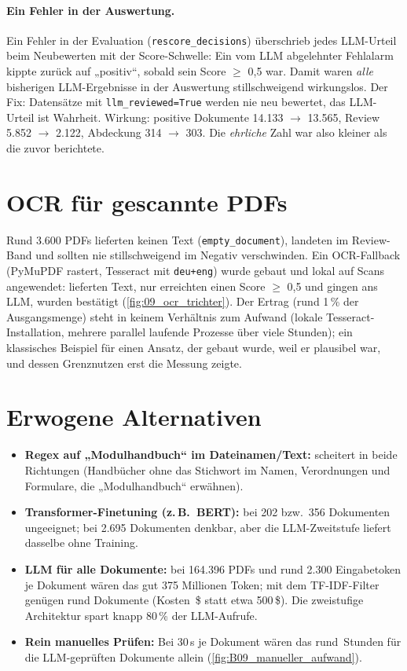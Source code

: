 \paragraph{Ein Fehler in der Auswertung.} Ein Fehler in der Evaluation (\texttt{rescore\_decisions}) überschrieb jedes LLM-Urteil beim Neubewerten mit der Score-Schwelle: Ein vom LLM abgelehnter Fehlalarm kippte zurück auf „positiv“, sobald sein Score $\ge$ 0,5 war. Damit waren \emph{alle} bisherigen LLM-Ergebnisse in der Auswertung stillschweigend wirkungslos. Der Fix: Datensätze mit \texttt{llm\_reviewed=True} werden nie neu bewertet, das LLM-Urteil ist Wahrheit. Wirkung: positive Dokumente 14.133 $\to$ 13.565, Review 5.852 $\to$ 2.122, Abdeckung 314 $\to$ 303. Die \emph{ehrliche} Zahl war also kleiner als die zuvor berichtete.

\section{OCR für gescannte PDFs}
Rund 3.600 PDFs lieferten keinen Text (\texttt{empty\_document}), landeten im Review-Band und sollten nie stillschweigend im Negativ verschwinden. Ein OCR-Fallback (PyMuPDF rastert, Tesseract mit \texttt{deu+eng}) wurde gebaut und lokal auf \zOCRDone{} Scans angewendet: \zOCRText{} lieferten Text, nur \zOCRLLM{} erreichten einen Score $\ge$ 0,5 und gingen ans LLM, \zOCRConf{} wurden bestätigt (\cref{fig:09_ocr_trichter}). Der Ertrag (rund 1\,\% der Ausgangsmenge) steht in keinem Verhältnis zum Aufwand (lokale Tesseract-Installation, mehrere parallel laufende Prozesse über viele Stunden); ein klassisches Beispiel für einen Ansatz, der gebaut wurde, weil er plausibel war, und dessen Grenznutzen erst die Messung zeigte.


\section{Erwogene Alternativen}
\begin{itemize}
  \item \textbf{Regex auf „Modulhandbuch“ im Dateinamen/Text:} scheitert in beide Richtungen (Handbücher ohne das Stichwort im Namen, Verordnungen und Formulare, die „Modulhandbuch“ erwähnen).
  \item \textbf{Transformer-Finetuning (z.\,B.\ BERT):} bei 202 bzw.\ 356 Dokumenten ungeeignet; bei 2.695 Dokumenten denkbar, aber die LLM-Zweitstufe liefert dasselbe ohne Training.
  \item \textbf{LLM für alle Dokumente:} bei 164.396 PDFs und rund 2.300 Eingabetoken je Dokument wären das gut 375 Millionen Token; mit dem TF-IDF-Filter genügen rund \zLLMReviewed{} Dokumente (Kosten \zKostenBedrock{}\,\$ statt etwa 500\,\$). Die zweistufige Architektur spart knapp 80\,\% der LLM-Aufrufe.
  \item \textbf{Rein manuelles Prüfen:} Bei 30\,s je Dokument wären das rund \zManuellOhneH{}\,Stunden für die LLM-geprüften Dokumente allein (\cref{fig:B09_manueller_aufwand}).
\end{itemize}
